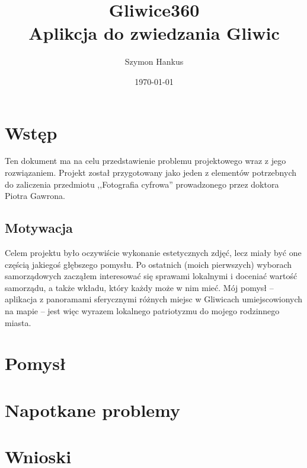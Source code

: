 \documentclass[a4paper]{mwart}
\title{Gliwice360 \\ Aplikcja do zwiedzania Gliwic}
\author{Szymon Hankus}
\date{\today}
\begin{document}
\maketitle
\tableofcontents

\section{Wstęp}
Ten dokument ma na celu przedstawienie problemu projektowego wraz z jego
rozwiązaniem. Projekt został przygotowany jako jeden z elementów potrzebnych do
zaliczenia przedmiotu ,,Fotografia cyfrowa'' prowadzonego przez doktora Piotra
Gawrona.

\subsection{Motywacja}
Celem projektu było oczywiście wykonanie estetycznych zdjęć, lecz miały być one
częścią jakiegoś głębszego pomysłu. Po ostatnich (moich pierwszych) wyborach
samorządowych zacząłem interesować się sprawami lokalnymi i doceniać wartość 
samorządu, a także wkładu, który każdy może w nim mieć. Mój pomysł -- aplikacja
z panoramami sferycznymi różnych miejsc w Gliwicach umiejscowionych na mapie --
jest więc wyrazem lokalnego patriotyzmu do mojego rodzinnego miasta.

\section{Pomysł}

\section{Napotkane problemy}

\section{Wnioski}
\end{document}
